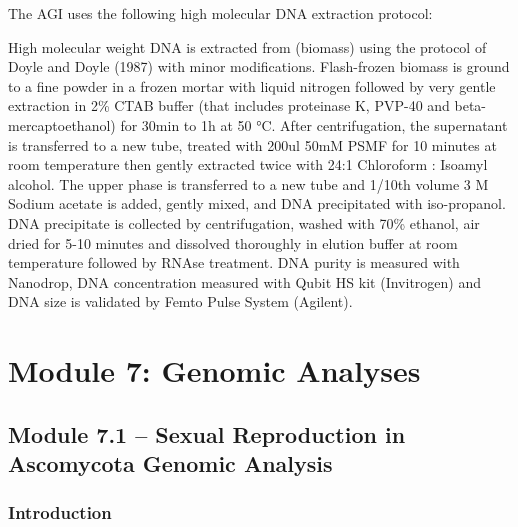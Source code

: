 \documentclass[
  letterpaper,
  DIV=11,
  numbers=noendperiod]{scrreprt}
\begin{document}
The AGI uses the following high molecular DNA extraction protocol:

High molecular weight DNA is extracted from (biomass) using the protocol
of Doyle and Doyle (1987) with minor modifications. Flash-frozen biomass
is ground to a fine powder in a frozen mortar with liquid nitrogen
followed by very gentle extraction in 2\% CTAB buffer (that includes
proteinase K, PVP-40 and beta-mercaptoethanol) for 30min to 1h at 50 °C.
After centrifugation, the supernatant is transferred to a new tube,
treated with 200ul 50mM PSMF for 10 minutes at room temperature then
gently extracted twice with 24:1 Chloroform : Isoamyl alcohol. The upper
phase is transferred to a new tube and 1/10th volume 3 M Sodium acetate
is added, gently mixed, and DNA precipitated with iso-propanol. DNA
precipitate is collected by centrifugation, washed with 70\% ethanol,
air dried for 5-10 minutes and dissolved thoroughly in elution buffer at
room temperature followed by RNAse treatment. DNA purity is measured
with Nanodrop, DNA concentration measured with Qubit HS kit (Invitrogen)
and DNA size is validated by Femto Pulse System (Agilent).


\chapter*{Module 7: Genomic Analyses}\label{module-7-genomic-analyses}


\section*{Module 7.1 -- Sexual Reproduction in Ascomycota Genomic
Analysis}\label{module-7.1-sexual-reproduction-in-ascomycota-genomic-analysis}


\subsection*{Introduction}\label{introduction-5}
\end{document}
